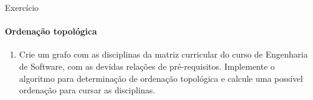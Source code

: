 \begin{frame}{Exercício}
	\framesubtitle{Ordenação topológica}
	
	\begin{enumerate}
		\item Crie um grafo com as disciplinas da matriz curricular do curso de Engenharia de Software, com as devidas relações de pré-requisitos. Implemente o algoritmo para determinação de ordenação topológica e calcule uma possível ordenação para cursar as disciplinas.
	\end{enumerate}
\end{frame}




